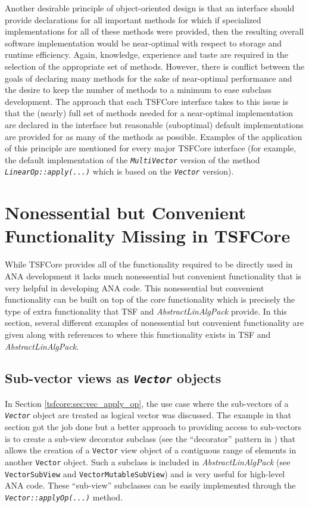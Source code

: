 Another desirable principle of object-oriented design is that an
interface should provide declarations for all important methods for
which if specialized implementations for all of these methods were
provided, then the resulting overall software implementation would be
near-optimal with respect to storage and runtime efficiency.  Again,
knowledge, experience and taste are required in the selection of the
appropriate set of methods.  However, there is conflict between the
goals of declaring many methods for the sake of near-optimal
performance and the desire to keep the number of methods to a minimum
to ease subclass development.  The approach that each TSFCore
interface takes to this issue is that the (nearly) full set of methods
needed for a near-optimal implementation are declared in the interface
but reasonable (suboptimal) default implementations are provided for
as many of the methods as possible.  Examples of the application of
this principle are mentioned for every major TSFCore interface (for
example, the default implementation of the
{}\texttt{\textit{Multi\-Vector}} version of the method
{}\texttt{\textit{LinearOp\-::apply(\-...)}} which is based on the
{}\texttt{\textit{Vector}} version).

%
\section{Nonessential but Convenient Functionality Missing in TSFCore}
\label{tsfcore:sec:convenience_functionality}
%

While TSFCore provides all of the functionality required to be
directly used in ANA development it lacks much nonessential but
convenient functionality that is very helpful in developing ANA code.
This nonessential but convenient functionality can be built on top of
the core functionality which is precisely the type of extra
functionality that TSF and {}\textit{AbstractLinAlgPack} provide.  In
this section, several different examples of nonessential but
convenient functionality are given along with references to where this
functionality exists in TSF and {}\textit{AbstractLinAlgPack}.

%
\subsection{Sub-vector views as {}\texttt{\textit{Vector}} objects}
%

In Section {}\ref{tsfcore:sec:vec_apply_op}, the use case where the
sub-vectors of a {}\texttt{\textit{Vector}} object are treated as
logical vector was discussed.  The example in that section got the job
done but a better approach to providing access to sub-vectors is to
create a sub-view decorator subclass (see the ``decorator'' pattern in
{}\cite{ref:gama_et_al_1995}) that allows the creation of a
{}\texttt{Vector} view object of a contiguous range of elements in
another {}\texttt{Vector} object.  Such a subclass is included in
{}\textit{AbstractLinAlgPack} (see {}\texttt{VectorSubView} and
{}\texttt{Vector\-Mutable\-Sub\-View}) and is very useful for
high-level ANA code.  These ``sub-view'' subclasses can be easily
implemented through the {}\texttt{\textit{Vector\-::applyOp(\-...)}}
method.

